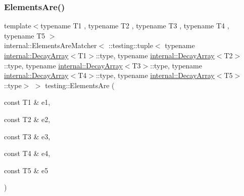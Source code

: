 \mbox{\label{namespacetesting_aa075d52e84310659ca8636c6e7d5c9b2}} 
\subsubsection{\texorpdfstring{ElementsAre()}{ElementsAre()}\hspace{0.1cm}{\footnotesize\ttfamily [6/11]}}
{\footnotesize\ttfamily template$<$typename T1 , typename T2 , typename T3 , typename T4 , typename T5 $>$ \\
internal\+::\+Elements\+Are\+Matcher$<$ \+::testing\+::tuple$<$ typename \mbox{\hyperlink{structtesting_1_1internal_1_1DecayArray}{internal\+::\+Decay\+Array}}$<$T1$>$\+::type, typename \mbox{\hyperlink{structtesting_1_1internal_1_1DecayArray}{internal\+::\+Decay\+Array}}$<$T2$>$\+::type, typename \mbox{\hyperlink{structtesting_1_1internal_1_1DecayArray}{internal\+::\+Decay\+Array}}$<$T3$>$\+::type, typename \mbox{\hyperlink{structtesting_1_1internal_1_1DecayArray}{internal\+::\+Decay\+Array}}$<$T4$>$\+::type, typename \mbox{\hyperlink{structtesting_1_1internal_1_1DecayArray}{internal\+::\+Decay\+Array}}$<$T5$>$\+::type$>$ $>$ testing\+::\+Elements\+Are (\begin{DoxyParamCaption}\item[{const T1 \&}]{e1,  }\item[{const T2 \&}]{e2,  }\item[{const T3 \&}]{e3,  }\item[{const T4 \&}]{e4,  }\item[{const T5 \&}]{e5 }\end{DoxyParamCaption})\hspace{0.3cm}{\ttfamily [inline]}}

\mbox{\label{namespacetesting_a725b7a52e5eea9fe8f4ce46be6fd7159}} 

